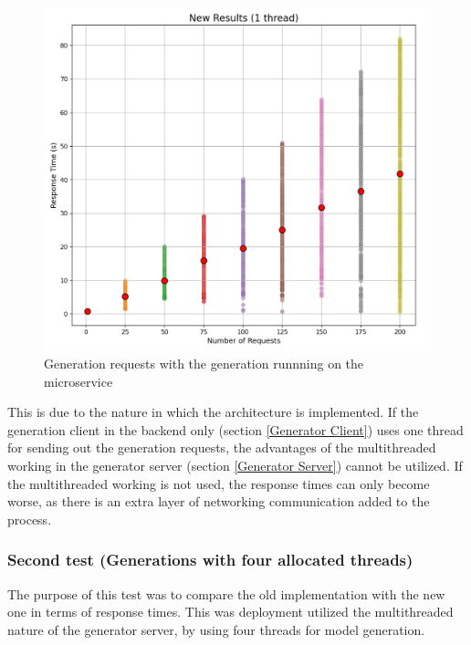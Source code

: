 			\begin{figure}[h!] 
				\begin{center}
					\includegraphics[scale=0.6]{include/imgs/1thread_new.PNG}
					\caption{Generation requests with the generation runnning on the microservice}
					\label{1threadnew}
				\end{center}
			\end{figure}

			This is due to the nature in which the architecture is implemented. If the generation client in the backend only (section \ref{Generator Client})
			uses one thread for sending out the 
			generation requests, the advantages of the multithreaded working in the generator server (section \ref{Generator Server}) cannot be utilized. 
			If the multithreaded working is not used, the response times 
			can only become worse, as there is an extra layer of networking communication added to the process. 

			\pagebreak
			\subsubsection{Second test (Generations with four allocated threads)}\label{testtwo}
				The purpose of this test was to compare the old implementation with the new one in terms of response times. This was 
				deployment utilized the multithreaded nature of the generator server, by using four threads for model generation.

